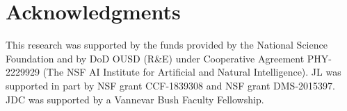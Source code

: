 \section*{Acknowledgments}
This research was supported by the funds provided by the National Science Foundation and by DoD OUSD (R\&E) under Cooperative Agreement PHY-2229929 (The NSF AI Institute for Artificial and Natural Intelligence). JL was supported in part by NSF grant CCF-1839308 and NSF grant DMS-2015397. JDC was supported by a Vannevar Bush Faculty Fellowship.